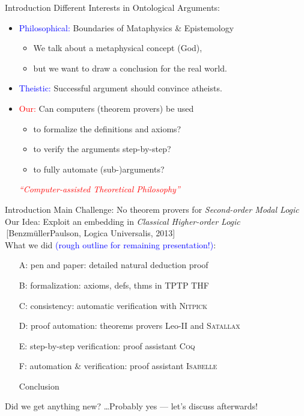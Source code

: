 \begin{frame}{Introduction} \Large
Different Interests in Ontological Arguments: \\[1em]
\begin{itemize}
\item \textcolor{blue}{Philosophical:} Boundaries of Mataphysics \& Epistemology
  \begin{itemize}
  \item We talk about a metaphysical concept (God), 
  \item but we want to draw
      a conclusion for the real world. \\[2em]
  \end{itemize} 
\item \textcolor{blue}{Theistic:} Successful argument should convince atheists. \\[2em]
\item \textcolor{red}{Our:} Can computers (theorem provers) be used
  \begin{itemize}
  \item to formalize the definitions and axioms?
  \item to verify the arguments step-by-step?
  \item to fully automate (sub-)arguments? \\[1em]
  \end{itemize}
  \textcolor{red}{\emph{``Computer-assisted Theoretical Philosophy''}}
\end{itemize}
\end{frame}

\begin{frame}{Introduction} \large
Main Challenge: \hfill No theorem provers for \emph{Second-order Modal
  Logic} \\[1em]

Our Idea: \hfill Exploit an embedding in \emph{Classical Higher-order
  Logic} \\
\,\hfill {\small [Benzm\"ullerPaulson, Logica Universalis, 2013]} \\[2em]

What we did \textcolor{blue}{(rough outline for remaining
  presentation!)}: \\

\begin{itemize}
\item[A:] pen and paper: detailed natural deduction proof 
\item[B:] formalization: axioms, defs, thms  in \textsc{TPTP THF}
\item[C:] consistency: automatic verification with \textsc{Nitpick} 
\item[D:] proof automation: theorems provers Leo-II and \textsc{Satallax} 
\item[E:] step-by-step verification: proof assistant \textsc{Coq} 
\item[F:] automation \& verification: proof assistant
  \textsc{Isabelle}
\item[ ] Conclusion 
\end{itemize}
Did we get anything new? \ldots Probably yes --- let's discuss afterwards!
\end{frame}

